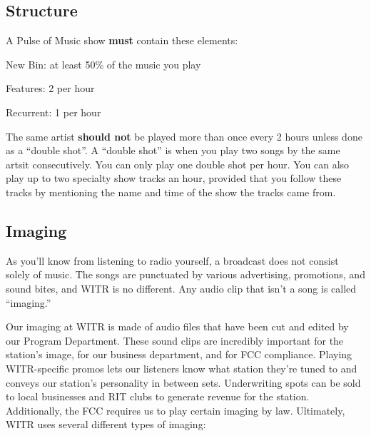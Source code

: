 \documentclass{witrman}
\begin{document}
\subsection{Structure}

A Pulse of Music show \textbf{must} contain these elements:

\begin{tightitemize}
    \item New Bin: at least 50\% of the music you play
    \item Features: 2 per hour
    \item Recurrent: 1 per hour
\end{tightitemize}

The same artist \textbf{should not} be played more than once every 2 hours
unless done as a  ``double shot''.  A ``double shot'' is when you play two songs
by the same artsit consecutively. You can only play one double shot per hour.
You can also play up to two specialty show tracks an hour, provided that you
follow these tracks by mentioning the name and time of the show the tracks
came from.  

\subsection{Imaging}

As you'll know from listening to radio yourself, a broadcast does not consist
solely of music.  The songs are punctuated by various advertising, promotions,
and sound bites, and WITR is no different.  Any audio clip that isn't a song is
called ``imaging.''

Our imaging at WITR is made of audio files that have been cut and edited by our
Program Department.  These sound clips are incredibly important for the
station's image, for our business department, and for FCC compliance.  Playing
WITR-specific promos lets our listeners know what station they're tuned to and
conveys our station's personality in between sets.  Underwriting spots can be
sold to local businesses and RIT clubs to generate revenue for the station.
Additionally, the FCC requires us to play certain imaging by law.  Ultimately,
WITR uses several different types of imaging:
\end{document}

